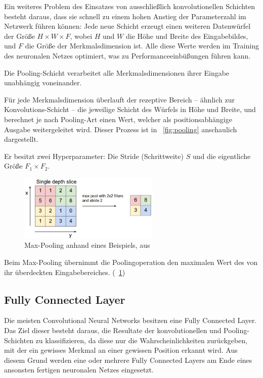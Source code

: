 Ein weiteres Problem des Einsatzes von ausschließlich konvolutionellen Schichten besteht daraus, dass sie schnell zu einem hohen Anstieg der Parameterzahl im Netzwerk führen können: Jede neue Schicht erzeugt einen weiteren Datenwürfel der Größe $H\times W\times F$, wobei $H$ und $W$ die Höhe und Breite des Eingabebildes, und $F$ die Größe der Merkmalsdimension ist. Alle diese Werte werden im Training des neuronalen Netzes optimiert, was zu Performanceeinbüßungen führen kann. \cite{cs231n}

Die Pooling-Schicht verarbeitet alle Merkmalsdimensionen ihrer Eingabe unabhängig voneinander.

Für jede Merkmalsdimension überlauft der rezeptive Bereich -- ähnlich zur Konvolutions-Schicht -- die jeweilige Schicht des Würfels in Höhe und Breite, und berechnet je nach Pooling-Art einen Wert, welcher als positionsabhängige Ausgabe weitergeleitet wird. Dieser Prozess ist in \figurename~\ref{fig:pooling} anschaulich dargestellt.

Er besitzt zwei Hyperparameter: Die Stride (Schrittweite) $S$ und die eigentliche Größe $F_1\times F_2$. \cite{cs231n}

\begin{figure}[H]
	\centering
	\includegraphics[width=0.6\textwidth,keepaspectratio]{images/cs231n/maxpool.jpg}
	\captionsetup{width=0.6\textwidth}
	\caption{Max-Pooling anhand eines Beispiels, aus \cite{cs231n}}
	\label{fig:maxpooling}
\end{figure}

Beim Max-Pooling übernimmt die Poolingoperation den maximalen Wert des von ihr überdeckten Eingabebereiches. (\vgl \figurename~\ref{fig:maxpooling})

\subsection{Fully Connected Layer}
\label{ssec:fcn}
Die meisten Convolutional Neural Networks besitzen eine Fully Connected Layer. Das Ziel dieser besteht daraus, die Resultate der konvolutionellen und Pooling-Schichten zu klassifizieren, da diese nur die Wahrscheinlichkeiten zurückgeben, mit der ein gewisses Merkmal an einer gewissen Position erkannt wird. Aus diesem Grund werden eine oder mehrere Fully Connected Layers am Ende eines ansonsten fertigen neuronalen Netzes eingesetzt. \cite{geva}

